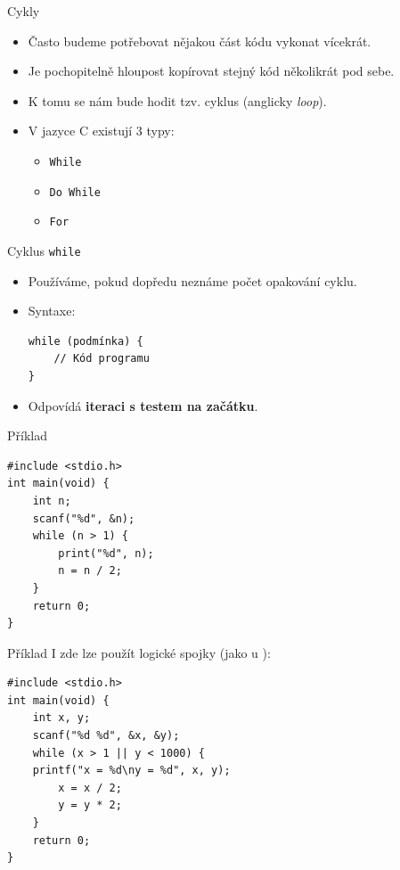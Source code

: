 \documentclass[14pt,aspectratio=169]{beamer}
\begin{document}
    \begin{frame}[t]{Cykly}
        \begin{itemize}
            \item Často budeme potřebovat nějakou část kódu vykonat vícekrát.
            \item Je pochopitelně hloupost kopírovat stejný kód několikrát pod sebe. 
            \item K tomu se nám bude hodit tzv. cyklus (anglicky \emph{loop}).
            \item V jazyce C existují 3 typy:
            \begin{itemize}
                \item \texttt{While}
                \item \texttt{Do While}
                \item \texttt{For}
            \end{itemize}
        \end{itemize}
    \end{frame}

    \begin{frame}[t,fragile]{Cyklus \texttt{while}}
        \begin{itemize}
            \item Používáme, pokud dopředu neznáme počet opakování cyklu.
            \item Syntaxe:
            \begin{lstlisting}
while (podmínka) {
    // Kód programu
}
            \end{lstlisting}
            \item Odpovídá \textbf{iteraci s testem na začátku}.
        \end{itemize}
    \end{frame}

    \begin{frame}[fragile]{Příklad}
        \begin{lstlisting}
#include <stdio.h>
int main(void) {
    int n;
    scanf("%d", &n);
    while (n > 1) {
        print("%d", n);
        n = n / 2;
    }
    return 0;
}
        \end{lstlisting}
    \end{frame}

    \begin{frame}[t,fragile]{Příklad}
        I zde lze použít logické spojky (jako u ):
        \begin{lstlisting}
#include <stdio.h>
int main(void) {
    int x, y;
    scanf("%d %d", &x, &y);
    while (x > 1 || y < 1000) {
    printf("x = %d\ny = %d", x, y);
        x = x / 2;
        y = y * 2;
    }
    return 0;
}
        \end{lstlisting}
    \end{frame}
\end{document}
